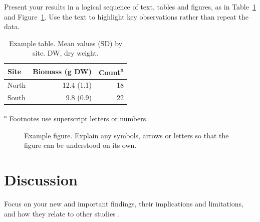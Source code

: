 \documentclass{upei-fos-thesis}
\begin{document}
Present your results in a logical sequence of text, tables and figures, as in
Table~\ref{tab:example} and Figure~\ref{fig:example}. Use the text to highlight key
observations rather than repeat the data.

\begin{table}[htbp]
  \caption{Example table. Mean values (SD) by site. DW, dry weight.}
  \label{tab:example}
  \begin{tabular}{lrr}
    \toprule
    Site & Biomass (g DW) & Count\textsuperscript{a} \\
    \midrule
    North & 12.4 (1.1) & 18 \\
    South &  9.8 (0.9) & 22 \\
    \bottomrule
  \end{tabular}

  \footnotesize\textsuperscript{a} Footnotes use superscript letters or numbers.
\end{table}

\begin{figure}[htbp]
  \centering
  \caption{Example figure. Explain any symbols, arrows or letters so that the figure
    can be understood on its own.}
  \label{fig:example}
\end{figure}

\chapter{Discussion}

Focus on your new and important findings, their implications and limitations, and
how they relate to other studies \citep{jones2019}.

\clearpage
{}
{}
\renewcommand\bibname{Literature Cited}


\end{document}
